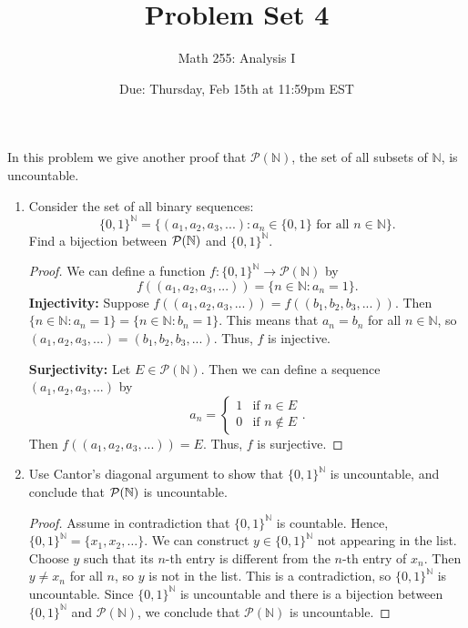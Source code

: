 \documentclass[10pt]{article}
\newcommand{\N}{\mathbb{N}}
\newenvironment{problem}[2][Problem]{\begin{trivlist}
\item[\hskip \labelsep {\bfseries #1}\hskip \labelsep {\bfseries #2.}]}{\end{trivlist}}
\begin{document}
\title{Problem Set 4}
\author{Math 255: Analysis I}
\date{Due: Thursday, Feb 15th at 11:59pm EST}

\maketitle

\begin{problem}{1}
	In this problem we give another proof that $ \mathcal{P}(\N) $, the set of all subsets of $ \N $, is uncountable.
	\begin{enumerate}
		\item Consider the set of all binary sequences:
		\[ \{0,1\}^{\N} = \{ (a_1,a_2,a_3,...) : a_n \in \{0,1\} \text{ for all } n \in \N \}. \]
		Find a bijection between $ \cal{P}(\N) $ and $ \{0,1\}^{\N} $.
        \begin{proof}
            We can define a function $f: \{0,1\}^{\N} \to \mathcal{P}(\N)$ by
            \[f((a_1,a_2,a_3,...)) = \{n \in \N : a_n = 1\}.\]
            \textbf{Injectivity:} Suppose $f((a_1,a_2,a_3,...)) = f((b_1,b_2,b_3,...))$. Then $\{n \in \N : a_n = 1\} = \{n \in \N : b_n = 1\}$. This means that $a_n = b_n$ for all $n \in \N$, so $(a_1,a_2,a_3,...) = (b_1,b_2,b_3,...)$. Thus, $f$ is injective.

            \textbf{Surjectivity:} Let $E \in \mathcal{P}(\N)$. Then we can define a sequence $(a_1,a_2,a_3,...)$ by
            \[a_n = \begin{cases} 1 & \text{if } n \in E \\ 0 & \text{if } n \notin E \end{cases}.\]
            Then $f((a_1,a_2,a_3,...)) = E$. Thus, $f$ is surjective.
        \end{proof}
		\item Use Cantor's diagonal argument to show that $ \{0,1\}^{\N} $ is uncountable, and conclude that $ \cal{P}(\N) $ is uncountable.
            \begin{proof}
            Assume in contradiction that  $ \{0,1\}^{\N} $ is countable. Hence, $ \{0,1\}^{\N} = \{x_1, x_2, \ldots \} $. We can construct $y \in \{0,1\}^{\N} $ not appearing in the list.
            Choose $y$ such that its $n$-th entry is different from the $n$-th entry of $x_n$. Then $y \neq x_n$ for all $n$, so $y$ is not in the list. This is a contradiction, so $ \{0,1\}^{\N} $ is uncountable. Since $ \{0,1\}^{\N} $ is uncountable and there is a bijection between $ \{0,1\}^{\N} $ and $ \mathcal{P}(\N) $, we conclude that $ \mathcal{P}(\N) $ is uncountable.
            \end{proof}
	\end{enumerate}
\end{problem}
\end{document}
